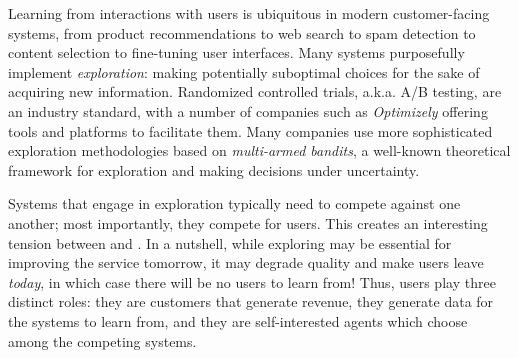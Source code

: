 Learning from interactions with users is ubiquitous in modern customer-facing systems, from product recommendations to web search to spam detection to content selection to fine-tuning user interfaces. Many systems purposefully implement \emph{exploration}: making potentially suboptimal choices for the sake of acquiring new information. Randomized controlled trials, a.k.a. A/B testing, are an industry standard, with a number of companies such as \emph{Optimizely} offering tools and platforms to facilitate them. Many companies use more sophisticated exploration methodologies based on \emph{multi-armed bandits}, a well-known theoretical framework for exploration and making decisions under uncertainty.


Systems that engage in exploration typically need to compete against one another; most importantly, they compete for users. This creates an interesting tension between \exploration and \competition. In a nutshell, while exploring may be essential for improving the service tomorrow, it may degrade quality and make users leave \emph{today}, in which case there will be no users to learn from! Thus, users play three distinct roles: they are customers that generate revenue, they generate data for the systems to learn from, and they are self-interested agents which choose among the competing systems.

